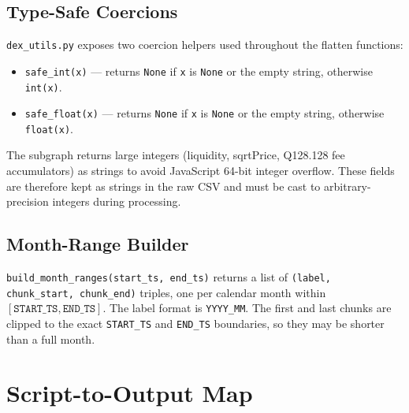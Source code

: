 \documentclass[11pt,a4paper]{article}
\begin{document}
\subsection{Type-Safe Coercions}

\texttt{dex\_utils.py} exposes two coercion helpers used throughout the
flatten functions:

\begin{itemize}
  \item \texttt{safe\_int(x)} --- returns \texttt{None} if \texttt{x} is
        \texttt{None} or the empty string, otherwise \texttt{int(x)}.
  \item \texttt{safe\_float(x)} --- returns \texttt{None} if \texttt{x} is
        \texttt{None} or the empty string, otherwise \texttt{float(x)}.
\end{itemize}

The subgraph returns large integers (liquidity, sqrtPrice, Q128.128 fee
accumulators) as strings to avoid JavaScript 64-bit integer overflow. These
fields are therefore kept as strings in the raw CSV and must be cast to
arbitrary-precision integers during processing.

\subsection{Month-Range Builder}

\texttt{build\_month\_ranges(start\_ts, end\_ts)} returns a list of
\texttt{(label, chunk\_start, chunk\_end)} triples, one per calendar month
within $[\texttt{START\_TS}, \texttt{END\_TS}]$. The label format is
\texttt{YYYY\_MM}. The first and last chunks are clipped to the exact
\texttt{START\_TS} and \texttt{END\_TS} boundaries, so they may be
shorter than a full month.

\section{Script-to-Output Map}
\label{sec:map}
\end{document}
